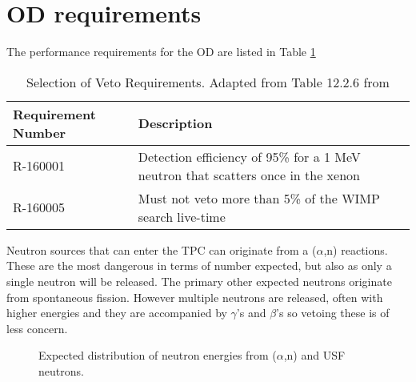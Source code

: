 \section{OD requirements}

\par
The performance requirements for the OD are listed in Table \ref{tab:veto_requirements}

\begin{table}[!htbp]
    \centering
    \begin{tabular}{p{}p{}} %
    \hline
    {Requirement Number} & {Description} \\ \hline
    R-160001             & Detection efficiency of 95\% for a 1 MeV neutron that scatters once in the xenon \\
    R-160005             & Must not veto more than 5\% of the WIMP search live-time
    \end{tabular}
    \caption{Selection of Veto Requirements. Adapted from Table 12.2.6 from \cite{LZ_TechnicalDesignReview_ref}}
    \label{tab:veto_requirements}
\end{table} 

\par
Neutron sources that can enter the TPC can originate from a ($\alpha$,n) reactions.
These are the most dangerous in terms of number expected, but also as only a single neutron will be released.
The primary other expected neutrons originate from spontaneous fission.
However multiple neutrons are released, often with higher energies and they are accompanied by $\gamma$'s and $\beta$'s so vetoing these is of less concern.

\begin{figure}[!htbp]
    \centering
    \caption{Expected distribution of neutron energies from ($\alpha$,n) and USF neutrons.}
    \label{fig:simulation_background_neutron_energies}
\end{figure}


